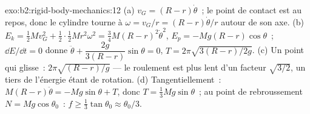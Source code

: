 \begin{solution}{exo:b2:rigid-body-mechanics:12}
(a) $v_G = (R - r)\dot\theta$~; le point de contact est au repos, donc le
cylindre tourne à $\omega = v_G/r = (R - r)\dot\theta/r$ autour de son axe.
(b) $E_k = \tfrac12Mv_G^2 + \tfrac12\cdot\tfrac12Mr^2\omega^2 = \tfrac34M(R - r)^2
\dot\theta^2$, $E_p = -Mg(R - r)\cos\theta$~; $\dd E/\dd t = 0$ donne $\ddot\theta
+ \dfrac{2g}{3(R - r)}\sin\theta = 0$, $T = 2\pi\sqrt{3(R - r)/2g}$. (c) Un
point qui glisse~: $2\pi\sqrt{(R - r)/g}$ --- le roulement est plus lent d'un facteur $\sqrt{3/2}$,
un tiers de l'énergie étant de rotation. (d) Tangentiellement~: $M(R - r)\ddot\theta =
-Mg\sin\theta + T$, donc $T = \tfrac13Mg\sin\theta$~; au point de rebroussement
$N = Mg\cos\theta_0$~: $f \ge \tfrac13\tan\theta_0 \approx \theta_0/3$.
\end{solution}

